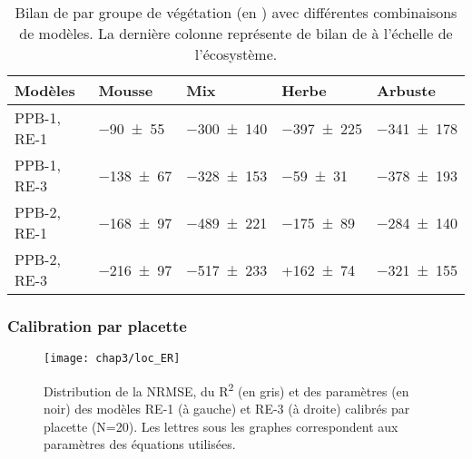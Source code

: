 \begin{table}
\centering
\caption{Bilan de \coo par groupe de végétation (en \si{\gcma}) avec différentes combinaisons de modèles. La dernière colonne représente de bilan de \coo à l'échelle de l'écosystème.}
\label{table:bdc_grp}
\begin{tabular}{lllll}  \toprule
Modèles & Mousse & Mix & Herbe & Arbuste  \\ \midrule
PPB-1, RE-1 &  \num{-90(55)} & \num{-300(140)} & \num{-397(225)} & \num{-341(178)}\\[+1ex]
PPB-1, RE-3 &  \num{-138(67)} & \num{-328(153)} & \num{-59(31)} & \num{-378(193)} \\[+1ex]
PPB-2, RE-1 &  \num{-168(97)} & \num{-489(221)} & \num{-175(89)} & \num{-284(140)} \\[+1ex]
PPB-2, RE-3 &  \num{-216(97)} & \num{-517(233)} & +\num{162(74)} & \num{-321(155)} \\[+1ex]
\bottomrule
\end{tabular}
\end{table}

\subsubsection{Calibration par placette}


\begin{figure}
\centering
\texttt{[image: chap3/loc\_ER]}
\caption{Distribution de la NRMSE, du R\textsuperscript{2} (en gris) et des paramètres (en noir) des modèles RE-1 (à gauche) et RE-3 (à droite) calibrés par placette (N=20). Les lettres sous les graphes correspondent aux paramètres des équations utilisées.}
\label{fig:loc_ER}
\end{figure}

